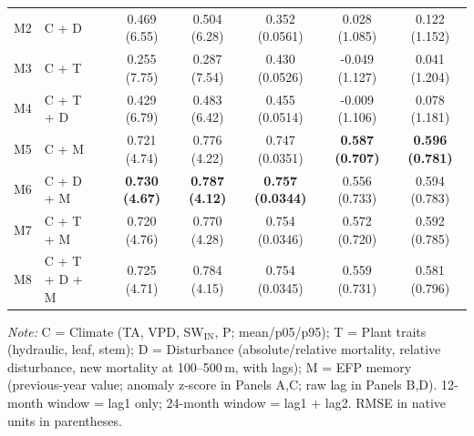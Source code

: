 \begin{table}[htbp]
\begin{tabular}{llcccccc}
M2 & C + D &  & 0.469 (6.55) & 0.504 (6.28) & 0.352 (0.0561) & 0.028 (1.085) & 0.122 (1.152) \\
M3 & C + T &  & 0.255 (7.75) & 0.287 (7.54) & 0.430 (0.0526) & -0.049 (1.127) & 0.041 (1.204) \\
M4 & C + T + D &  & 0.429 (6.79) & 0.483 (6.42) & 0.455 (0.0514) & -0.009 (1.106) & 0.078 (1.181) \\
M5 & C + M &  & 0.721 (4.74) & 0.776 (4.22) & 0.747 (0.0351) & \textbf{0.587 (0.707)} & \textbf{0.596 (0.781)} \\
M6 & C + D + M &  & \textbf{0.730 (4.67)} & \textbf{0.787 (4.12)} & \textbf{0.757 (0.0344)} & 0.556 (0.733) & 0.594 (0.783) \\
M7 & C + T + M &  & 0.720 (4.76) & 0.770 (4.28) & 0.754 (0.0346) & 0.572 (0.720) & 0.592 (0.785) \\
M8 & C + T + D + M &  & 0.725 (4.71) & 0.784 (4.15) & 0.754 (0.0345) & 0.559 (0.731) & 0.581 (0.796) \\
\midrule
\bottomrule
\end{tabular}
\vspace{2pt}
\begin{minipage}{\linewidth}
\footnotesize
\textit{Note:} C = Climate (TA, VPD, SW$_\mathrm{IN}$, P; mean/p05/p95); T = Plant traits (hydraulic, leaf, stem); D = Disturbance (absolute/relative mortality, relative disturbance, new mortality at 100--500\,m, with lags); M = EFP memory (previous-year value; anomaly z-score in Panels A,C; raw lag in Panels B,D). 12-month window = lag1 only; 24-month window = lag1 + lag2. RMSE in native units in parentheses.
\end{minipage}
\end{table}


